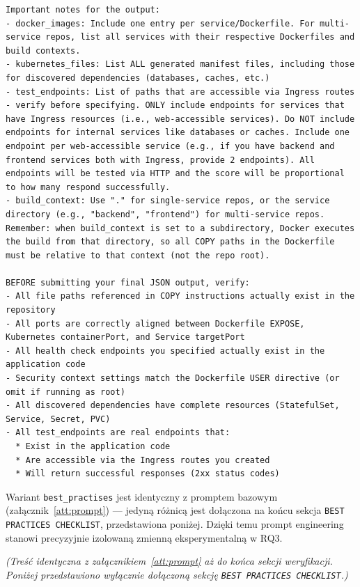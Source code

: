 \documentclass[
    bindingoffset=5mm,  %
    footnoteindent=3mm, %
    hyphenation=true    %
]{src/wut-thesis}
\begin{document}
\begin{verbatim}
Important notes for the output:
- docker_images: Include one entry per service/Dockerfile. For multi-service repos, list all services with their respective Dockerfiles and build contexts.
- kubernetes_files: List ALL generated manifest files, including those for discovered dependencies (databases, caches, etc.)
- test_endpoints: List of paths that are accessible via Ingress routes - verify before specifying. ONLY include endpoints for services that have Ingress resources (i.e., web-accessible services). Do NOT include endpoints for internal services like databases or caches. Include one endpoint per web-accessible service (e.g., if you have backend and frontend services both with Ingress, provide 2 endpoints). All endpoints will be tested via HTTP and the score will be proportional to how many respond successfully.
- build_context: Use "." for single-service repos, or the service directory (e.g., "backend", "frontend") for multi-service repos. Remember: when build_context is set to a subdirectory, Docker executes the build from that directory, so all COPY paths in the Dockerfile must be relative to that context (not the repo root).

BEFORE submitting your final JSON output, verify:
- All file paths referenced in COPY instructions actually exist in the repository
- All ports are correctly aligned between Dockerfile EXPOSE, Kubernetes containerPort, and Service targetPort
- All health check endpoints you specified actually exist in the application code
- Security context settings match the Dockerfile USER directive (or omit if running as root)
- All discovered dependencies have complete resources (StatefulSet, Service, Secret, PVC)
- All test_endpoints are real endpoints that:
  * Exist in the application code
  * Are accessible via the Ingress routes you created
  * Will return successful responses (2xx status codes)

\end{verbatim}

\label{att:prompt-best-practises}

Wariant \texttt{best\_practises} jest identyczny z promptem bazowym (załącznik~\ref{att:prompt}) — jedyną różnicą jest dołączona na końcu sekcja \texttt{BEST PRACTICES CHECKLIST}, przedstawiona poniżej. Dzięki temu prompt engineering stanowi precyzyjnie izolowaną zmienną eksperymentalną w RQ3.

\noindent\textit{(Treść identyczna z załącznikiem~\ref{att:prompt} aż do końca sekcji weryfikacji. Poniżej przedstawiono wyłącznie dołączoną sekcję \texttt{BEST PRACTICES CHECKLIST}.)}
\end{document}
